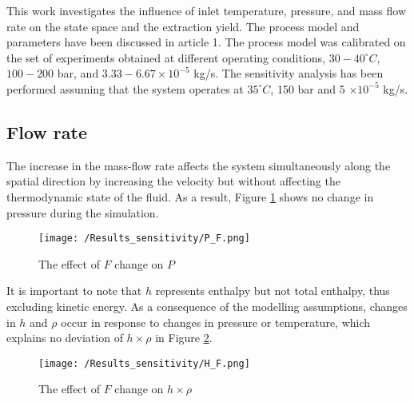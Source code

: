 \documentclass[../Article_Sensitivity_Analsysis.tex]{subfiles}
\begin{document}
	
	\label{CH: Results}
	
	This work investigates the influence of inlet temperature, pressure, and mass flow rate on the state space and the extraction yield. The process model and parameters have been discussed in {\color{red}article 1}. The process model was calibrated on the set of experiments obtained at different operating conditions, $30 - 40^\circ C$, $100 - 200$ bar, and $3.33-6.67 \times 10^{-5}$ kg/s. The sensitivity analysis has been performed assuming that the system operates at $35^\circ C$, 150 bar and 5 $\times 10^{-5}$ kg/s.
	
	\subsection{Flow rate}
	
	The increase in the mass-flow rate affects the system simultaneously along the spatial direction by increasing the velocity but without affecting the thermodynamic state of the fluid. As a result, Figure \ref{fig:Sensitivty_F_P} shows no change in pressure during the simulation.
	
	\begin{figure}[h!]
		\centering
		\texttt{[image: /Results\_sensitivity/P\_F.png]}
		\caption{The effect of $F$ change on $P$}
		\label{fig:Sensitivty_F_P}
	\end{figure}
	
	It is important to note that $h$ represents enthalpy but not total enthalpy, thus excluding kinetic energy. As a consequence of the modelling assumptions, changes in $h$ and $\rho$ occur in response to changes in pressure or temperature, which explains no deviation of $h \times \rho$ in Figure \ref{fig:Sensitivty_F_H}.
    
        
    \begin{figure}[h!]
    	\centering
    	\texttt{[image: /Results\_sensitivity/H\_F.png]}
    	\caption{The effect of $F$ change on $h \times \rho$}
    	\label{fig:Sensitivty_F_H}
    \end{figure}
   
\end{document}
